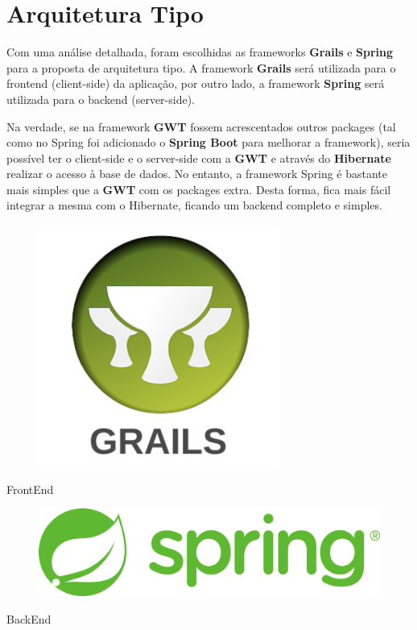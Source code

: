 \chapter{Arquitetura Tipo}

\hspace{5mm} Com uma análise detalhada, foram escolhidas as frameworks \textbf{Grails} e \textbf{Spring} para a proposta de arquitetura tipo. A framework \textbf{Grails} será utilizada para o frontend (client-side) da aplicação, por outro lado, a framework \textbf{Spring} será utilizada para o backend (server-side).

\hspace{5mm} Na verdade, se na framework \textbf{GWT} fossem acrescentados outros packages (tal como no Spring foi adicionado o \textbf{Spring Boot} para melhorar a framework), seria possível ter o client-side e o server-side com a \textbf{GWT} e através do \textbf{Hibernate} realizar o acesso à base de dados. No entanto, a framework Spring é bastante mais simples que a \textbf{GWT} com os packages extra. Desta forma, fica mais fácil integrar a mesma com o Hibernate, ficando um backend completo e simples.


\begin{minipage}{0.5\textwidth}
\begin{figure}[H]
\hfill
\includegraphics[scale=0.27]{images/grails.png}
\label{fig:cgrails}
\end{figure}
\end{minipage} \hfill
\begin{minipage}{0.45\textwidth}
FrontEnd
\end{minipage}

\begin{minipage}{0.5\textwidth}
\begin{figure}[H]
\hfill
\includegraphics[scale=0.11]{images/spring.png}
\label{fig:cspring}
\end{figure}
\end{minipage} \hfill
\begin{minipage}{0.45\textwidth}
BackEnd
\end{minipage}

